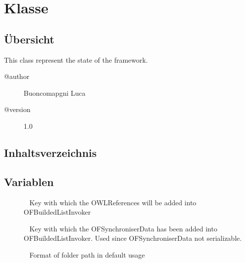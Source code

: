 
\section[OFSystemState]{Klasse }\label{ontologyFramework.OFRunning.OFSystemState-class}
\subsection{Übersicht}
This class represent the state of the framework.
\begin{description}
\item[@author] 
Buoncomapgni Luca
\item[@version] 
1.0
\end{description}
\subsection{Inhaltsverzeichnis}
\subsection{Variablen}
\begin{description}
\item[{\label{ontologyFramework.OFRunning.OFSystemState.OWLREFERENCES_keyWord}}]
~ Key with which the OWLReferences will be added into OFBuildedListInvoker
\item[{\label{ontologyFramework.OFRunning.OFSystemState.SYNCRHONISERLIST_keyWord}}]
~ Key with which the OFSynchroniserData has been added into OFBuildedListInvoker.
  Used since OFSynchroniserData not serializable.
\item[{\label{ontologyFramework.OFRunning.OFSystemState.DATAFORMAT}}]
~ Format of folder path in default usage
\end{description}
